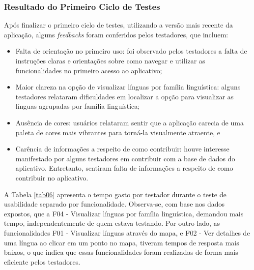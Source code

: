 \subsubsection{Resultado do Primeiro Ciclo de Testes}
\label{sec:Resultado do Primeiro Ciclo de Testes}
Após finalizar o primeiro ciclo de testes, utilizando a versão mais recente da aplicação, alguns \textit{feedbacks} foram conferidos pelos testadores, que incluem:

\begin{itemize}
	\item Falta de orientação no primeiro uso: foi observado pelos testadores a falta de instruções claras e orientações sobre como navegar e utilizar as funcionalidades no primeiro acesso ao aplicativo;
	\item Maior clareza na opção de visualizar línguas por família linguística: alguns testadores relataram dificuldades em localizar a opção para visualizar as línguas agrupadas por família linguística;
	\item Ausência de cores: usuários relataram sentir que a aplicação carecia de uma paleta de cores mais vibrantes para torná-la visualmente atraente, e
	\item Carência de informações a respeito de como contribuir: houve interesse manifestado por alguns testadores em contribuir com a base de dados do aplicativo. Entretanto, sentiram falta de informações a respeito 
	de como contribuir no aplicativo.
\end{itemize}

A Tabela \ref{tab06} apresenta o tempo gasto por testador durante o teste de usabilidade separado por funcionalidade. Observa-se, com base nos dados expostos, que a F04 - Visualizar línguas por família linguística, 
demandou mais tempo, independentemente de quem estava testando. Por outro lado, as funcionalidades F01 - Visualizar línguas através do mapa, e F02 - Ver detalhes de uma língua ao clicar em um ponto no mapa, tiveram tempos 
de resposta mais baixos, o que indica que essas funcionalidades foram realizadas de forma mais eficiente pelos testadores.


